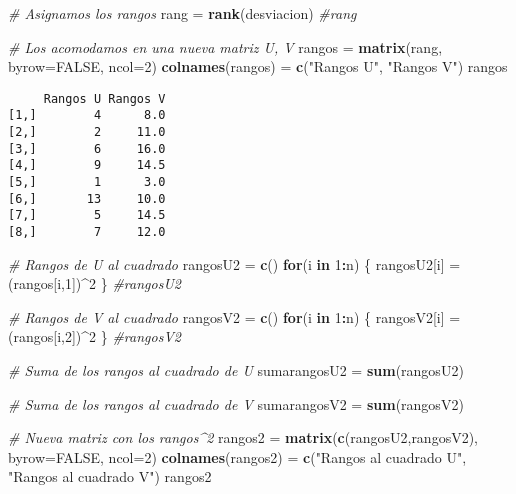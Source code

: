 \documentclass[
  a4paper,
  oneside,
  openany]{book}
\newenvironment{Shaded}{\begin{snugshade}}{\end{snugshade}}
\newcommand{\CommentTok}[1]{\textcolor[rgb]{0.56,0.35,0.01}{\textit{#1}}}
\newcommand{\ControlFlowTok}[1]{\textcolor[rgb]{0.13,0.29,0.53}{\textbf{#1}}}
\newcommand{\DataTypeTok}[1]{\textcolor[rgb]{0.13,0.29,0.53}{#1}}
\newcommand{\DecValTok}[1]{\textcolor[rgb]{0.00,0.00,0.81}{#1}}
\newcommand{\KeywordTok}[1]{\textcolor[rgb]{0.13,0.29,0.53}{\textbf{#1}}}
\newcommand{\NormalTok}[1]{#1}
\newcommand{\OperatorTok}[1]{\textcolor[rgb]{0.81,0.36,0.00}{\textbf{#1}}}
\newcommand{\OtherTok}[1]{\textcolor[rgb]{0.56,0.35,0.01}{#1}}
\newcommand{\StringTok}[1]{\textcolor[rgb]{0.31,0.60,0.02}{#1}}
\begin{document}
\begin{Shaded}
\begin{Highlighting}[]
\CommentTok{\# Asignamos los rangos}
\NormalTok{rang =}\StringTok{ }\KeywordTok{rank}\NormalTok{(desviacion)}
\CommentTok{\#rang}

\CommentTok{\# Los acomodamos en una nueva matriz U, V}
\NormalTok{rangos =}\StringTok{ }\KeywordTok{matrix}\NormalTok{(rang, }\DataTypeTok{byrow=}\OtherTok{FALSE}\NormalTok{, }\DataTypeTok{ncol=}\DecValTok{2}\NormalTok{)}
\KeywordTok{colnames}\NormalTok{(rangos) =}\StringTok{ }\KeywordTok{c}\NormalTok{(}\StringTok{"Rangos U"}\NormalTok{, }\StringTok{"Rangos V"}\NormalTok{)}
\NormalTok{rangos}
\end{Highlighting}
\end{Shaded}

\begin{verbatim}
     Rangos U Rangos V
[1,]        4      8.0
[2,]        2     11.0
[3,]        6     16.0
[4,]        9     14.5
[5,]        1      3.0
[6,]       13     10.0
[7,]        5     14.5
[8,]        7     12.0
\end{verbatim}

\begin{Shaded}
\begin{Highlighting}[]
\CommentTok{\# Rangos de U al cuadrado}
\NormalTok{rangosU2 =}\StringTok{ }\KeywordTok{c}\NormalTok{()}
\ControlFlowTok{for}\NormalTok{(i }\ControlFlowTok{in} \DecValTok{1}\OperatorTok{:}\NormalTok{n) \{}
\NormalTok{  rangosU2[i] =}\StringTok{ }\NormalTok{(rangos[i,}\DecValTok{1}\NormalTok{])}\OperatorTok{\^{}}\DecValTok{2}
\NormalTok{\}}
\CommentTok{\#rangosU2}

\CommentTok{\# Rangos de V al cuadrado}
\NormalTok{rangosV2 =}\StringTok{ }\KeywordTok{c}\NormalTok{()}
\ControlFlowTok{for}\NormalTok{(i }\ControlFlowTok{in} \DecValTok{1}\OperatorTok{:}\NormalTok{n) \{}
\NormalTok{  rangosV2[i] =}\StringTok{ }\NormalTok{(rangos[i,}\DecValTok{2}\NormalTok{])}\OperatorTok{\^{}}\DecValTok{2}
\NormalTok{\}}
\CommentTok{\#rangosV2}

\CommentTok{\# Suma de los rangos al cuadrado de U}
\NormalTok{sumarangosU2 =}\StringTok{ }\KeywordTok{sum}\NormalTok{(rangosU2)}

\CommentTok{\# Suma de los rangos al cuadrado de V}
\NormalTok{sumarangosV2 =}\StringTok{ }\KeywordTok{sum}\NormalTok{(rangosV2)}

\CommentTok{\# Nueva matriz con los rangos\^{}2}
\NormalTok{rangos2 =}\StringTok{ }\KeywordTok{matrix}\NormalTok{(}\KeywordTok{c}\NormalTok{(rangosU2,rangosV2), }\DataTypeTok{byrow=}\OtherTok{FALSE}\NormalTok{, }\DataTypeTok{ncol=}\DecValTok{2}\NormalTok{)}
\KeywordTok{colnames}\NormalTok{(rangos2) =}\StringTok{ }\KeywordTok{c}\NormalTok{(}\StringTok{"Rangos al cuadrado U"}\NormalTok{, }\StringTok{"Rangos al cuadrado V"}\NormalTok{)}
\NormalTok{rangos2}
\end{Highlighting}
\end{Shaded}
\end{document}
